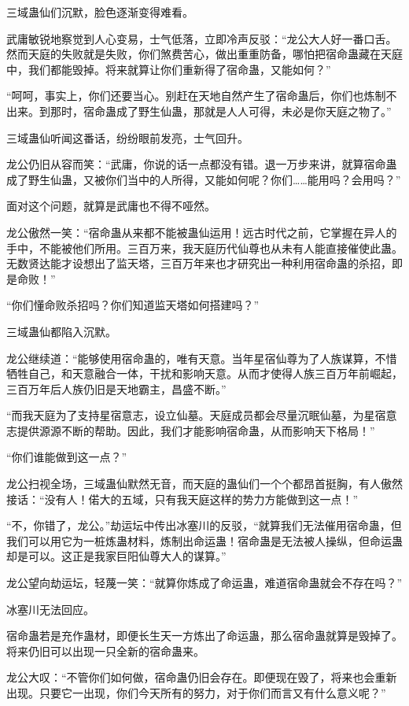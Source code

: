 \begin{this_body}
三域蛊仙们沉默，脸色逐渐变得难看。

武庸敏锐地察觉到人心变易，士气低落，立即冷声反驳：“龙公大人好一番口舌。然而天庭的失败就是失败，你们煞费苦心，做出重重防备，哪怕把宿命蛊藏在天庭中，我们都能毁掉。将来就算让你们重新得了宿命蛊，又能如何？”

“呵呵，事实上，你们还要当心。别赶在天地自然产生了宿命蛊后，你们也炼制不出来。到那时，宿命蛊成了野生仙蛊，那就是人人可得，未必是你天庭之物了。”

三域蛊仙听闻这番话，纷纷眼前发亮，士气回升。

龙公仍旧从容而笑：“武庸，你说的话一点都没有错。退一万步来讲，就算宿命蛊成了野生仙蛊，又被你们当中的人所得，又能如何呢？你们……能用吗？会用吗？”

面对这个问题，就算是武庸也不得不哑然。

龙公傲然一笑：“宿命蛊从来都不能被蛊仙运用！远古时代之前，它掌握在异人的手中，不能被他们所用。三百万来，我天庭历代仙尊也从未有人能直接催使此蛊。无数贤达能才设想出了监天塔，三百万年来也才研究出一种利用宿命蛊的杀招，即是命败！”

“你们懂命败杀招吗？你们知道监天塔如何搭建吗？”

三域蛊仙都陷入沉默。

龙公继续道：“能够使用宿命蛊的，唯有天意。当年星宿仙尊为了人族谋算，不惜牺牲自己，和天意融合一体，干扰和影响天意。从而才使得人族三百万年前崛起，三百万年后人族仍旧是天地霸主，昌盛不断。”

“而我天庭为了支持星宿意志，设立仙墓。天庭成员都会尽量沉眠仙墓，为星宿意志提供源源不断的帮助。因此，我们才能影响宿命蛊，从而影响天下格局！”

“你们谁能做到这一点？”

龙公扫视全场，三域蛊仙默然无音，而天庭的蛊仙们一个个都昂首挺胸，有人傲然接话：“没有人！偌大的五域，只有我天庭这样的势力方能做到这一点！”

“不，你错了，龙公。”劫运坛中传出冰塞川的反驳，“就算我们无法催用宿命蛊，但我们可以用它为一桩炼蛊材料，炼制出命运蛊！宿命蛊是无法被人操纵，但命运蛊却是可以。这正是我家巨阳仙尊大人的谋算。”

龙公望向劫运坛，轻蔑一笑：“就算你炼成了命运蛊，难道宿命蛊就会不存在吗？”

冰塞川无法回应。

宿命蛊若是充作蛊材，即便长生天一方炼出了命运蛊，那么宿命蛊就算是毁掉了。将来仍旧可以出现一只全新的宿命蛊来。

龙公大叹：“不管你们如何做，宿命蛊仍旧会存在。即便现在毁了，将来也会重新出现。只要它一出现，你们今天所有的努力，对于你们而言又有什么意义呢？”


\end{this_body}
